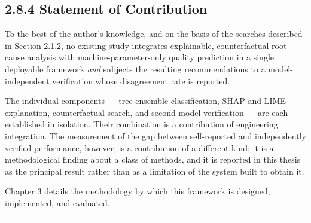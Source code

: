\hypertarget{statement-of-contribution}{%
\subsection{2.8.4 Statement of Contribution}\label{statement-of-contribution}}

To the best of the author's knowledge, and on the basis of the searches described in Section 2.1.2, no existing study integrates explainable, counterfactual root-cause analysis with machine-parameter-only quality prediction in a single deployable framework \emph{and} subjects the resulting recommendations to a model-independent verification whose disagreement rate is reported.

The individual components --- tree-ensemble classification, SHAP and LIME explanation, counterfactual search, and second-model verification --- are each established in isolation. Their combination is a contribution of engineering integration. The measurement of the gap between self-reported and independently verified performance, however, is a contribution of a different kind: it is a methodological finding about a class of methods, and it is reported in this thesis as the principal result rather than as a limitation of the system built to obtain it.

Chapter 3 details the methodology by which this framework is designed, implemented, and evaluated.

\begin{center}\rule{0.5\linewidth}{0.5pt}\end{center}
